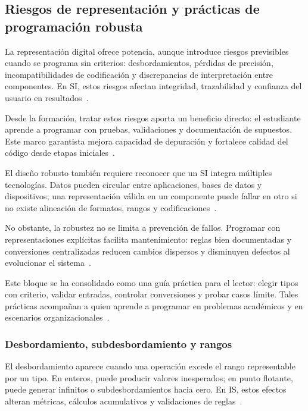 \documentclass[12pt,twoside]{book}
\begin{document}
				\subsection{Riesgos de representación y prácticas de programación robusta}
					\noindent
					La representación digital ofrece potencia, aunque introduce riesgos previsibles cuando se programa sin criterios: desbordamientos, pérdidas de precisión, incompatibilidades de codificación y discrepancias de interpretación entre componentes. En SI, estos riesgos afectan integridad, trazabilidad y confianza del usuario en resultados~\cite{ISO247722024Programming,Ghezzi2003Fundamentals,Laudon2020Management}.
					
					Desde la formación, tratar estos riesgos aporta un beneficio directo: el estudiante aprende a programar con pruebas, validaciones y documentación de supuestos. Este marco garantista mejora capacidad de depuración y fortalece calidad del código desde etapas iniciales~\cite{Pressman2019Software,Sommerville2015Software,Gaddis2022Starting}.
					
					El diseño robusto también requiere reconocer que un SI integra múltiples tecnologías. Datos pueden circular entre aplicaciones, bases de datos y dispositivos; una representación válida en un componente puede fallar en otro si no existe alineación de formatos, rangos y codificaciones~\cite{Kendall2014Systems,Silberschatz2018Operating,Elmasri2016Database}.
					
					No obstante, la robustez no se limita a prevención de fallos. Programar con representaciones explícitas facilita mantenimiento: reglas bien documentadas y conversiones centralizadas reducen cambios dispersos y disminuyen defectos al evolucionar el sistema~\cite{Ghezzi2003Fundamentals,Sommerville2015Software,Martin2008Clean}.
					
					Este bloque se ha consolidado como una guía práctica para el lector: elegir tipos con criterio, validar entradas, controlar conversiones y probar casos límite. Tales prácticas acompañan a quien aprende a programar en problemas académicos y en escenarios organizacionales~\cite{Hanly2015Problem,Gaddis2022Starting,ISO247722024Programming}.
					
					\subsubsection{Desbordamiento, subdesbordamiento y rangos}
						\noindent
						El desbordamiento aparece cuando una operación excede el rango representable por un tipo. En enteros, puede producir valores inesperados; en punto flotante, puede generar infinitos o subdesbordamientos hacia cero. En IS, estos efectos alteran métricas, cálculos acumulativos y validaciones de reglas~\cite{Tanenbaum2021Structured,ISO247722024Programming,Gaddis2022Starting}.
						
\end{document}
